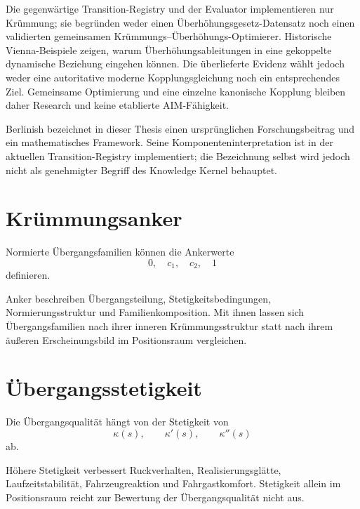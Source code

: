 Die gegenwärtige Transition-Registry und der Evaluator implementieren nur
Krümmung; sie begründen weder einen Überhöhungsgesetz-Datensatz noch einen
validierten gemeinsamen Krümmungs--Überhöhungs-Optimierer. Historische
Vienna-Beispiele zeigen, warum Überhöhungsableitungen in eine gekoppelte
dynamische Beziehung eingehen können. Die überlieferte Evidenz wählt jedoch
weder eine autoritative moderne Kopplungsgleichung noch ein entsprechendes
Ziel. Gemeinsame Optimierung und eine einzelne kanonische Kopplung bleiben
daher Research und keine etablierte AIM-Fähigkeit.

\begin{remark}
Berlinish bezeichnet in dieser Thesis einen ursprünglichen Forschungsbeitrag
und ein mathematisches Framework. Seine Komponenteninterpretation ist in der
aktuellen Transition-Registry implementiert; die Bezeichnung selbst wird
jedoch nicht als genehmigter Begriff des Knowledge Kernel behauptet.
\end{remark}

\section{Krümmungsanker}

\begin{definition}[Krümmungsanker]
\label{def:curvature-anchors}
Normierte Übergangsfamilien können die Ankerwerte
\[
0,\quad c_1,\quad c_2,\quad 1
\]
definieren.
\end{definition}

Anker beschreiben Übergangsteilung, Stetigkeitsbedingungen,
Normierungsstruktur und Familienkomposition. Mit ihnen lassen sich
Übergangsfamilien nach ihrer inneren Krümmungsstruktur statt nach ihrem
äußeren Erscheinungsbild im Positionsraum vergleichen.

\section{Übergangsstetigkeit}

\begin{definition}[Übergangsstetigkeit]
\label{def:transition-continuity}
Die Übergangsqualität hängt von der Stetigkeit von
\[
\kappa(s),\qquad \kappa'(s),\qquad \kappa''(s)
\]
ab.
\end{definition}

Höhere Stetigkeit verbessert Ruckverhalten, Realisierungsglätte,
Laufzeitstabilität, Fahrzeugreaktion und Fahrgastkomfort. Stetigkeit allein im
Positionsraum reicht zur Bewertung der Übergangsqualität nicht aus.

